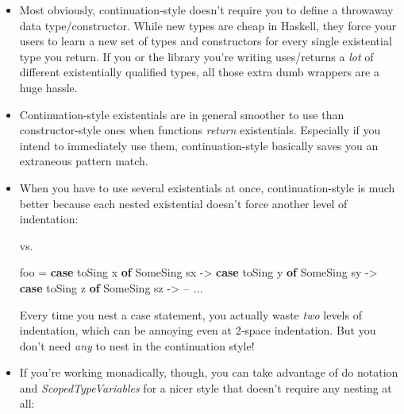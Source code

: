 \documentclass[]{article}
\newenvironment{Shaded}{}{}
\newcommand{\KeywordTok}[1]{\textcolor[rgb]{0.00,0.44,0.13}{\textbf{{#1}}}}
\newcommand{\DataTypeTok}[1]{\textcolor[rgb]{0.56,0.13,0.00}{{#1}}}
\newcommand{\CommentTok}[1]{\textcolor[rgb]{0.38,0.63,0.69}{\textit{{#1}}}}
\newcommand{\OtherTok}[1]{\textcolor[rgb]{0.00,0.44,0.13}{{#1}}}
\newcommand{\FunctionTok}[1]{\textcolor[rgb]{0.02,0.16,0.49}{{#1}}}
\newcommand{\NormalTok}[1]{{#1}}
\begin{document}
\begin{itemize}
\item
  Most obviously, continuation-style doesn't require you to define a throwaway
  data type/constructor. While new types are cheap in Haskell, they force your
  users to learn a new set of types and constructors for every single
  existential type you return. If you or the library you're writing uses/returns
  a \emph{lot} of different existentially qualified types, all those extra dumb
  wrappers are a huge hassle.
\item
  Continuation-style existentials are in general smoother to use than
  constructor-style ones when functions \emph{return} existentials. Especially
  if you intend to immediately use them, continuation-style basically saves you
  an extraneous pattern match.
\item
  When you have to use several existentials at once, continuation-style is much
  better because each nested existential doesn't force another level of
  indentation:

\begin{Shaded}
\end{Shaded}

  vs.

\begin{Shaded}
\begin{Highlighting}[]
\NormalTok{foo }\FunctionTok{=} \KeywordTok{case} \NormalTok{toSing x }\KeywordTok{of}
        \DataTypeTok{SomeSing} \NormalTok{sx }\OtherTok{->}
          \KeywordTok{case} \NormalTok{toSing y }\KeywordTok{of}
            \DataTypeTok{SomeSing} \NormalTok{sy }\OtherTok{->}
              \KeywordTok{case} \NormalTok{toSing z }\KeywordTok{of}
                \DataTypeTok{SomeSing} \NormalTok{sz }\OtherTok{->}
                  \CommentTok{-- ...}
\end{Highlighting}
\end{Shaded}

  Every time you nest a case statement, you actually waste \emph{two} levels of
  indentation, which can be annoying even at 2-space indentation. But you don't
  need \emph{any} to nest in the continuation style!
\item
  If you're working monadically, though, you can take advantage of do notation
  and \emph{ScopedTypeVariables} for a nicer style that doesn't require any
  nesting at all:


\end{itemize}
\end{document}
